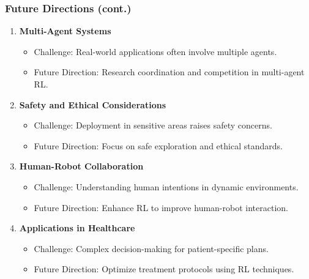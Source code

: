 \documentclass{beamer}
\begin{document}
\begin{frame}[fragile]
    \frametitle{Future Directions (cont.)}
    \begin{enumerate}[resume]
        \item \textbf{Multi-Agent Systems}
            \begin{itemize}
                \item Challenge: Real-world applications often involve multiple agents.
                \item Future Direction: Research coordination and competition in multi-agent RL.
            \end{itemize}

        \item \textbf{Safety and Ethical Considerations}
            \begin{itemize}
                \item Challenge: Deployment in sensitive areas raises safety concerns.
                \item Future Direction: Focus on safe exploration and ethical standards.
            \end{itemize}

        \item \textbf{Human-Robot Collaboration}
            \begin{itemize}
                \item Challenge: Understanding human intentions in dynamic environments.
                \item Future Direction: Enhance RL to improve human-robot interaction.
            \end{itemize}

        \item \textbf{Applications in Healthcare}
            \begin{itemize}
                \item Challenge: Complex decision-making for patient-specific plans.
                \item Future Direction: Optimize treatment protocols using RL techniques.
            \end{itemize}
    \end{enumerate}
\end{frame}
\end{document}
